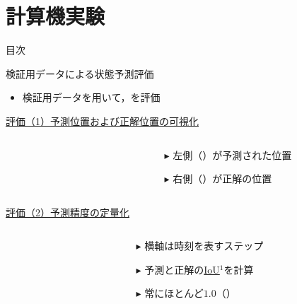 \section{計算機実験}

\begin{frame}[noframenumbering]{目次}
    \tableofcontents[currentsection]
\end{frame}

\begin{frame}{検証用データによる状態予測評価}
    \small
    \begin{itemize}
        \item 検証用データを用いて，を評価
    \end{itemize}
    \vspace{0.5zh}
    \uline{評価（1）予測位置および正解位置の可視化}
    \begin{columns}
        \begin{column}{.6\linewidth}
            \begin{figure}
            \end{figure}              
        \end{column}
        \hspace{-30pt}
        \begin{column}{.4\linewidth}
            \begin{itemize}
                \item[$\blacktriangleright$] 左側（）が予測された位置
                \item[$\blacktriangleright$] 右側（）が正解の位置
            \end{itemize}
        \end{column}
    \end{columns}
    \uline{評価（2）予測精度の定量化}
    \begin{columns}
        \begin{column}{.6\linewidth}
        \end{column}
        \hspace{-30pt}
        \begin{column}{.4\linewidth}
            \vspace{-2.5zh}
            \begin{itemize}
                \item[$\blacktriangleright$] 横軸は時刻を表すステップ
                \item[$\blacktriangleright$] 予測と正解の\uline{IoU}$^1$を計算
                \item[$\blacktriangleright$] 常にほとんど$1.0$（）
            \end{itemize}
        \end{column}
    \end{columns}
    \setcounter{footnote}{1}
\end{frame}

